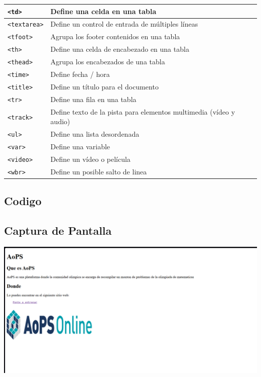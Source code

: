 \documentclass[11pt]{scrartcl}
\begin{document}
\begin{longtable}{|p{}|p{}|}
\hline
\texttt{<td>} & Define una celda en una tabla \\
\hline
\texttt{<textarea>} & Define un control de entrada de múltiples líneas \\
\hline
\texttt{<tfoot>} & Agrupa los footer contenidos en una tabla \\
\hline
\texttt{<th>} & Define una celda de encabezado en una tabla \\
\hline
\texttt{<thead>} & Agrupa los encabezados de una tabla \\
\hline
\texttt{<time>} & Define fecha / hora \\
\hline
\texttt{<title>} & Define un título para el documento \\
\hline
\texttt{<tr>} & Define una fila en una tabla \\
\hline
\texttt{<track>} & Define texto de la pista para elementos multimedia (vídeo y audio) \\
\hline
\texttt{<ul>} & Define una lista desordenada \\
\hline
\texttt{<var>} & Define una variable \\
\hline
\texttt{<video>} & Define un vídeo o película \\
\hline
\texttt{<wbr>} & Define un posible salto de linea \\
\hline
\end{longtable}


\subsection{Codigo}



\subsection{Captura de Pantalla}
\begin{center}
    \includegraphics[scale=0.5]{CapturaSinDetalles.png}
\end{center}
\end{document}
